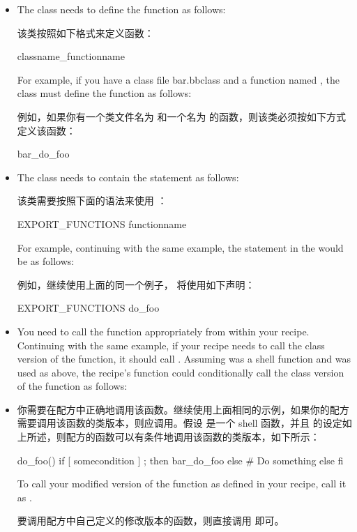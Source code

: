 \begin{itemize}
\setlength\itemsep{1.0em}
\item The class needs to define the function as follows:

\medskip
该类按照如下格式来定义函数：

\medskip
\begin{pyglist}
classname_functionname
\end{pyglist}

\medskip
For example, if you have a class file bar.bbclass and a function named , the class must define the function as follows:

\medskip
例如，如果你有一个类文件名为  和一个名为  的函数，则该类必须按如下方式定义该函数：

\medskip
\begin{pyglist}
bar_do_foo
\end{pyglist}

\item The class needs to contain the  statement as follows:

\medskip
该类需要按照下面的语法来使用 ：

\medskip
\begin{pyglist}
EXPORT_FUNCTIONS functionname
\end{pyglist}

\medskip
For example, continuing with the same example, the statement in the  would be as follows:

\medskip
例如，继续使用上面的同一个例子， 将使用如下声明：

\medskip
\begin{pyglist}
EXPORT_FUNCTIONS do_foo
\end{pyglist}

\item You need to call the function appropriately from within your recipe. Continuing with the same example, if your recipe needs to call the class version of the function, it should call . Assuming  was a shell function and  was used as above, the recipe's function could conditionally call the class version of the function as follows:

\item 你需要在配方中正确地调用该函数。继续使用上面相同的示例，如果你的配方需要调用该函数的类版本，则应调用。假设  是一个 shell 函数，并且  的设定如上所述，则配方的函数可以有条件地调用该函数的类版本，如下所示：

\begin{pyglist}
do_foo() {
    if [ somecondition ] ; then
        bar_do_foo
    else
        # Do something else
    fi
}
\end{pyglist}

\medskip
To call your modified version of the function as defined in your recipe, call it as .

\medskip
要调用配方中自己定义的修改版本的函数，则直接调用  即可。
\end{itemize}

